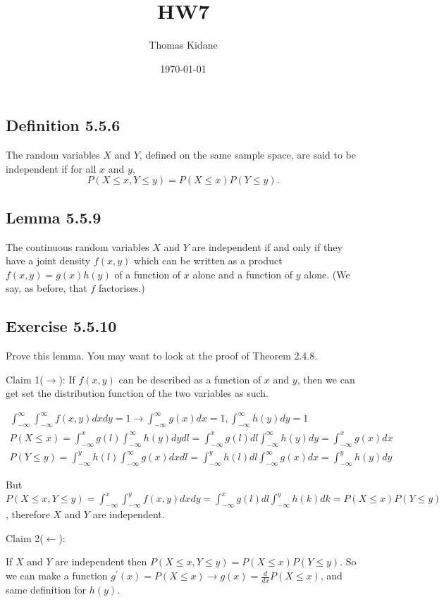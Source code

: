 \documentclass{article}
\title{HW7}
\author{Thomas Kidane}
\date{\today}
\begin{document}
\maketitle

\subsection*{Definition 5.5.6}
The random variables $X$ and $Y$, defined on the same sample space, are said to be independent if for all $x$ and $y$,
\[
P(X \leq x, Y \leq y) = P(X \leq x)P(Y \leq y).
\]

\subsection*{Lemma 5.5.9}
The continuous random variables $X$ and $Y$ are independent if and only if they have a joint density $f(x, y)$ which can be written as a product $f(x, y) = g(x)h(y)$ of a function of $x$ alone and a function of $y$ alone. (We say, as before, that $f$ factorises.)

\subsection*{Exercise 5.5.10}
Prove this lemma. You may want to look at the proof of Theorem 2.4.8.

Claim 1($\rightarrow$):
If $f(x,y)$ can be described as a function of $x$ and $y$, then we can get set the distribution function of the two variables as such.

\begin{align*}
  \int_{-\infty}^{\infty}\int_{-\infty}^{\infty}f(x,y)dxdy=1 \rightarrow \int_{-\infty}^{\infty}g(x)dx=1, \int_{-\infty}^{\infty}h(y)dy=1\\
  P(X\leq x)= \int_{-\infty}^{x}g(l)\int_{-\infty}^{\infty}h(y)dydl=\int_{-\infty}^{x}g(l)dl\int_{-\infty}^{\infty}h(y)dy=\int_{-\infty}^{x}g(x)dx\\
  P(Y\leq y)= \int_{-\infty}^{y}h(l)\int_{-\infty}^{\infty}g(x)dxdl=\int_{-\infty}^{y}h(l)dl\int_{-\infty}^{\infty}g(x)dx=\int_{-\infty}^{y}h(y)dy
\end{align*}

But $P(X\leq x, Y\leq y)=\int_{-\infty}^{x}\int_{-\infty}^{y}f(x,y)dxdy=\int_{-\infty}^{x}g(l)dl\int_{-\infty}^{y}h(k)dk=P(X\leq x)P(Y\leq y)$, 
therefore $X$ and $Y$ are independent.

Claim 2($\leftarrow$):

If $X$ and $Y$ are independent then $P(X\leq x,Y\leq y)=P(X\leq x)P(Y\leq y)$. So 
we can make a function $g^{'}(x)=P(X\leq x) \rightarrow g(x)=\frac{d}{dx}P(X\leq x)$, and same definition for $h(y)$.
\end{document}
